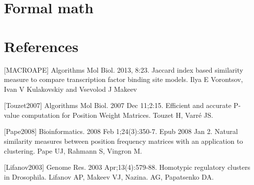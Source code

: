 \documentclass[draft]{article}
\newcommand*{\pvalue}{\mbox{P-value}}
\begin{document}










\section{Formal math}
  
  

\section*{References}
[MACROAPE] Algorithms Mol Biol. 2013, 8:23.
Jaccard index based similarity measure to compare transcription factor binding site models.
Ilya E Vorontsov, Ivan V Kulakovskiy and Vsevolod J Makeev

[Touzet2007] Algorithms Mol Biol. 2007 Dec 11;2:15. Efficient and accurate \pvalue  
computation for Position Weight Matrices. Touzet H, Varré JS.

[Pape2008] Bioinformatics. 2008 Feb 1;24(3):350-7. Epub 2008 Jan 2. Natural similarity 
measures between position frequency matrices with an application to clustering. Pape UJ, 
Rahmann S, Vingron M.

[Lifanov2003] Genome Res. 2003 Apr;13(4):579-88. Homotypic regulatory clusters in 
Drosophila. Lifanov AP, Makeev VJ, Nazina. AG, Papatsenko DA.
\end{document}
